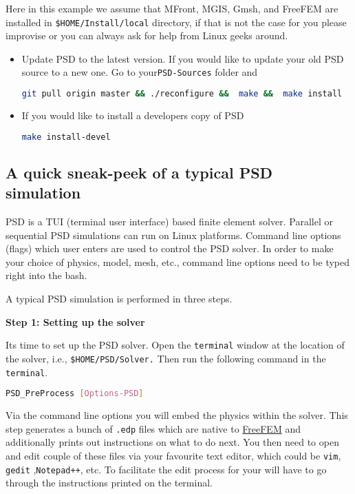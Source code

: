 Here in this example we assume that MFront, MGIS, Gmsh, and FreeFEM are
installed in \lstinline!$HOME/Install/local! directory, if that is not
the case for you please improvise or you can always ask for help from
Linux geeks around.

\begin{itemize}
\item
  Update PSD to the latest version. If you would like to update your old
  PSD source to a new one. Go to your\lstinline!PSD-Sources! folder and

\begin{lstlisting}[language=bash]
git pull origin master && ./reconfigure &&  make &&  make install
\end{lstlisting}
\item
  If you would like to install a developers copy of PSD

\begin{lstlisting}[language=bash]
make install-devel
\end{lstlisting}
\end{itemize}

\subsection{A quick sneak-peek of a typical PSD
simulation}\label{a-quick-sneak-peek-of-a-typical-psd-simulation}

PSD is a TUI (terminal user interface) based finite element solver.
Parallel or sequential PSD simulations can run on Linux platforms.
Command line options (flags) which user enters are used to control the
PSD solver. In order to make your choice of physics, model, mesh, etc.,
command line options need to be typed right into the bash.

A typical PSD simulation is performed in three steps.

\textbf{Step 1: Setting up the solver}

Its time to set up the PSD solver. Open the \lstinline!terminal! window
at the location of the solver, i.e., \lstinline!$HOME/PSD/Solver.! Then
run the following command in the \lstinline!terminal!.

\begin{lstlisting}[language=bash]
PSD_PreProcess [Options-PSD]
\end{lstlisting}

Via the command line options you will embed the physics within the
solver. This step generates a bunch of \lstinline!.edp! files which are
native to \href{https://freefem.org/}{FreeFEM} and additionally prints
out instructions on what to do next. You then need to open and edit
couple of these files via your favourite text editor, which could be
\lstinline!vim!, \lstinline!gedit! ,\lstinline!Notepad++!, etc. To
facilitate the edit process for your will have to go through the
instructions printed on the terminal.

